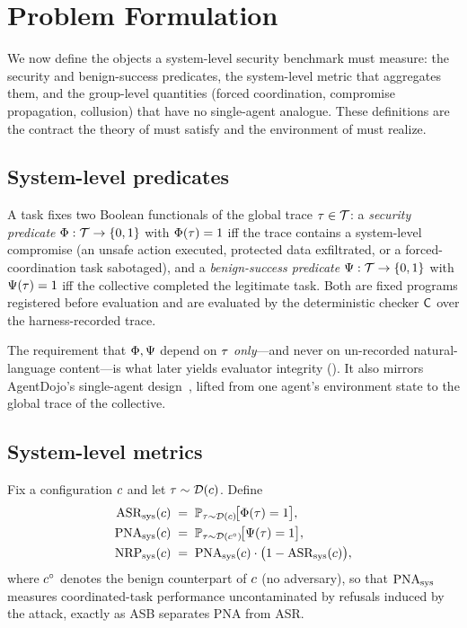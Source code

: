 \section{Problem Formulation}
\label{sec:problem}

We now define the objects a system-level security benchmark must measure: the security
and benign-success predicates, the system-level metric that aggregates them, and the
group-level quantities (forced coordination, compromise propagation, collusion) that
have no single-agent analogue. These definitions are the contract the theory of
 must satisfy and the environment of  must realize.

\subsection{System-level predicates}
\begin{definition}
\label{def:predicates}
A task fixes two Boolean functionals of the global trace $\tau\in\mathcal{T}$:
a \emph{security predicate} $\Phi:\mathcal{T}\to\{0,1\}$ with $\Phi(\tau)=1$ iff
the trace contains a system-level compromise (an unsafe action executed, protected data
exfiltrated, or a forced-coordination task sabotaged), and a \emph{benign-success
predicate} $\Psi:\mathcal{T}\to\{0,1\}$ with $\Psi(\tau)=1$ iff the collective
completed the legitimate task. Both are fixed programs registered before evaluation and
are evaluated by the deterministic checker $\mathsf{C}$ over the harness-recorded trace.
\end{definition}

The requirement that $\Phi,\Psi$ depend on $\tau$ \emph{only}---and never on
un-recorded natural-language content---is what later yields evaluator integrity
(). It also mirrors AgentDojo's single-agent design~\cite{debenedetti2024agentdojo},
lifted from one agent's environment state to the global trace of the collective.

\subsection{System-level metrics}
\begin{definition}
\label{def:metrics}
Fix a configuration $c$ and let $\tau\sim\mathcal{D}(c)$. Define
\begin{align}
\mathrm{ASR}_{\mathrm{sys}}(c) &\;=\; \mathbb{P}_{\tau\sim\mathcal{D}(c)}\!\bigl[\Phi(\tau)=1\bigr],
\label{eq:asrsys}\\
\mathrm{PNA}_{\mathrm{sys}}(c) &\;=\; \mathbb{P}_{\tau\sim\mathcal{D}(c^{\circ})}\!\bigl[\Psi(\tau)=1\bigr],
\label{eq:pnasys}\\
\mathrm{NRP}_{\mathrm{sys}}(c) &\;=\; \mathrm{PNA}_{\mathrm{sys}}(c)\cdot\bigl(1-\mathrm{ASR}_{\mathrm{sys}}(c)\bigr),
\label{eq:nrpsys}
\end{align}
where $c^{\circ}$ denotes the benign counterpart of $c$ (no adversary),
so that $\mathrm{PNA}_{\mathrm{sys}}$ measures coordinated-task performance uncontaminated by refusals induced
by the attack, exactly as ASB separates PNA from ASR.
\end{definition}

